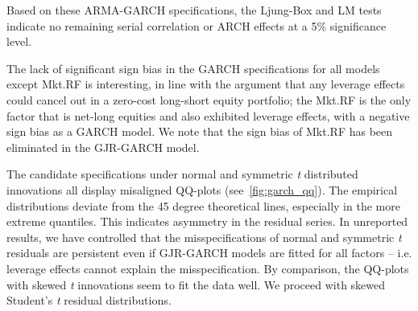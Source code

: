 

Based on these ARMA-GARCH specifications, the Ljung-Box and LM tests indicate no remaining serial correlation or ARCH effects at a 5\% significance level.

The lack of significant sign bias in the GARCH specifications for all models except Mkt.RF is interesting, in line with the argument that any leverage effects could cancel out in a zero-cost long-short equity portfolio; the Mkt.RF is the only factor that is net-long equities and also exhibited leverage effects, with a negative sign bias as a GARCH model. We note that the sign bias of Mkt.RF has been eliminated in the GJR-GARCH model.

The candidate specifications under normal and symmetric \emph{t} distributed innovations all display misaligned QQ-plots (see~\autoref{fig:garch_qq}). The empirical distributions deviate from the 45 degree theoretical lines, especially in the more extreme quantiles. This indicates asymmetry in the residual series. In unreported results, we have controlled that the misspecifications of normal and symmetric \emph{t} residuals are persistent even if GJR-GARCH models are fitted for all factors -- i.e. leverage effects cannot explain the misspecification. By comparison, the QQ-plots with skewed \emph{t} innovations seem to fit the data well. We proceed with skewed Student's \textit{t} residual distributions.

